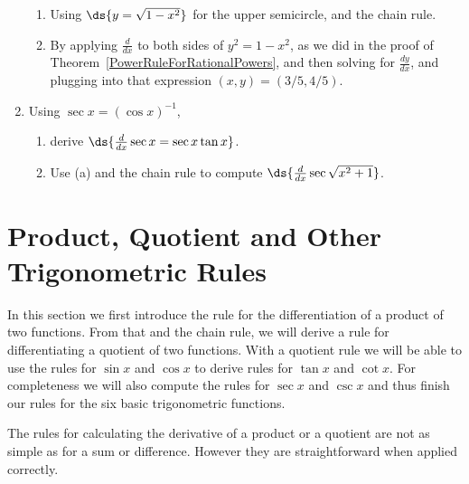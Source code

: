 \begin{multicols}{2}
\begin{enumerate}
\begin{enumerate}
\item Using $\ds{y=\sqrt{1-x^2}}$ for the upper semicircle, and
the chain rule.
\item By applying $\frac{d}{dx}$ to both sides of $y^2=1-x^2$,
as we did in the proof of Theorem~\ref{PowerRuleForRationalPowers},
and then solving for $\frac{dy}{dx}$, and plugging into that
expression $(x,y)=(3/5,4/5)$.
\end{enumerate}
\item Using $\sec x=(\cos x)^{-1}$, 
\begin{enumerate}
\item derive
$\ds{\frac{d}{dx}\sec x=\sec x\tan x}$.
\label{FindSecant'sDerivativeWithChainRuleExercise} 
\item
Use (a) and the chain rule to
compute
$\ds{\frac{d}{dx}\sec\sqrt{x^2+1}}$.
\end{enumerate}




\end{enumerate}




\end{multicols}


\newpage
\newpage
\section{Product, Quotient and Other Trigonometric Rules}
In this section we first introduce the rule for the differentiation
of a product of two functions.  From that and the chain rule,
we will derive a rule for differentiating a quotient of two
functions.  With a quotient rule we will be able to 
use the rules for $\sin x$ and $\cos x$ to
derive rules for $\tan x$ and $\cot x$.  For completeness
we will also compute the rules for $\sec x$ and $\csc x$
and thus finish
our rules for the six basic trigonometric functions.   

The rules for calculating the derivative of a product or
a quotient are not as simple as for a sum or difference.
However they are straightforward when applied correctly.

